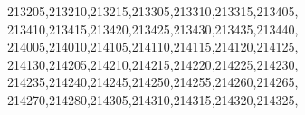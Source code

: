 \documentclass[
  12,
  dvipsnames]{article}
\newenvironment{Shaded}{\begin{snugshade}}{\end{snugshade}}
\newcommand{\NormalTok}[1]{#1}
\newcommand{\StringTok}[1]{\textcolor[rgb]{0.31,0.60,0.02}{#1}}
\begin{document}
\begin{Shaded}
\begin{Highlighting}[]
                  \StringTok{\textquotesingle{}213205\textquotesingle{}}\NormalTok{,}\StringTok{\textquotesingle{}213210\textquotesingle{}}\NormalTok{,}\StringTok{\textquotesingle{}213215\textquotesingle{}}\NormalTok{,}\StringTok{\textquotesingle{}213305\textquotesingle{}}\NormalTok{,}\StringTok{\textquotesingle{}213310\textquotesingle{}}\NormalTok{,}\StringTok{\textquotesingle{}213315\textquotesingle{}}\NormalTok{,}\StringTok{\textquotesingle{}213405\textquotesingle{}}\NormalTok{,}
                  \StringTok{\textquotesingle{}213410\textquotesingle{}}\NormalTok{,}\StringTok{\textquotesingle{}213415\textquotesingle{}}\NormalTok{,}\StringTok{\textquotesingle{}213420\textquotesingle{}}\NormalTok{,}\StringTok{\textquotesingle{}213425\textquotesingle{}}\NormalTok{,}\StringTok{\textquotesingle{}213430\textquotesingle{}}\NormalTok{,}\StringTok{\textquotesingle{}213435\textquotesingle{}}\NormalTok{,}\StringTok{\textquotesingle{}213440\textquotesingle{}}\NormalTok{,}
                  \StringTok{\textquotesingle{}214005\textquotesingle{}}\NormalTok{,}\StringTok{\textquotesingle{}214010\textquotesingle{}}\NormalTok{,}\StringTok{\textquotesingle{}214105\textquotesingle{}}\NormalTok{,}\StringTok{\textquotesingle{}214110\textquotesingle{}}\NormalTok{,}\StringTok{\textquotesingle{}214115\textquotesingle{}}\NormalTok{,}\StringTok{\textquotesingle{}214120\textquotesingle{}}\NormalTok{,}\StringTok{\textquotesingle{}214125\textquotesingle{}}\NormalTok{,}
                  \StringTok{\textquotesingle{}214130\textquotesingle{}}\NormalTok{,}\StringTok{\textquotesingle{}214205\textquotesingle{}}\NormalTok{,}\StringTok{\textquotesingle{}214210\textquotesingle{}}\NormalTok{,}\StringTok{\textquotesingle{}214215\textquotesingle{}}\NormalTok{,}\StringTok{\textquotesingle{}214220\textquotesingle{}}\NormalTok{,}\StringTok{\textquotesingle{}214225\textquotesingle{}}\NormalTok{,}\StringTok{\textquotesingle{}214230\textquotesingle{}}\NormalTok{,}
                  \StringTok{\textquotesingle{}214235\textquotesingle{}}\NormalTok{,}\StringTok{\textquotesingle{}214240\textquotesingle{}}\NormalTok{,}\StringTok{\textquotesingle{}214245\textquotesingle{}}\NormalTok{,}\StringTok{\textquotesingle{}214250\textquotesingle{}}\NormalTok{,}\StringTok{\textquotesingle{}214255\textquotesingle{}}\NormalTok{,}\StringTok{\textquotesingle{}214260\textquotesingle{}}\NormalTok{,}\StringTok{\textquotesingle{}214265\textquotesingle{}}\NormalTok{,}
                  \StringTok{\textquotesingle{}214270\textquotesingle{}}\NormalTok{,}\StringTok{\textquotesingle{}214280\textquotesingle{}}\NormalTok{,}\StringTok{\textquotesingle{}214305\textquotesingle{}}\NormalTok{,}\StringTok{\textquotesingle{}214310\textquotesingle{}}\NormalTok{,}\StringTok{\textquotesingle{}214315\textquotesingle{}}\NormalTok{,}\StringTok{\textquotesingle{}214320\textquotesingle{}}\NormalTok{,}\StringTok{\textquotesingle{}214325\textquotesingle{}}\NormalTok{,}

\end{Highlighting}
\end{Shaded}
\end{document}
